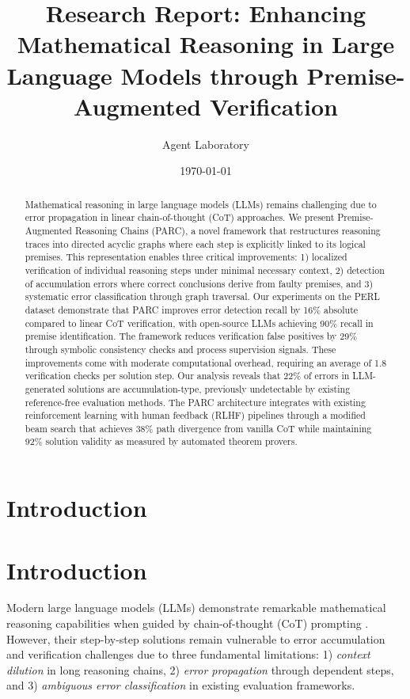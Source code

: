\documentclass{article}
\title{Research Report: Enhancing Mathematical Reasoning in Large Language Models through Premise-Augmented Verification}
\author{Agent Laboratory}
\date{\today}
\begin{document}
\maketitle

\begin{abstract}

\end{abstract}

\section*{Introduction}
\begin{abstract}
Mathematical reasoning in large language models (LLMs) remains challenging due to error propagation in linear chain-of-thought (CoT) approaches. We present Premise-Augmented Reasoning Chains (PARC), a novel framework that restructures reasoning traces into directed acyclic graphs where each step is explicitly linked to its logical premises. This representation enables three critical improvements: 1) localized verification of individual reasoning steps under minimal necessary context, 2) detection of accumulation errors where correct conclusions derive from faulty premises, and 3) systematic error classification through graph traversal. Our experiments on the PERL dataset demonstrate that PARC improves error detection recall by 16\% absolute compared to linear CoT verification, with open-source LLMs achieving 90\% recall in premise identification. The framework reduces verification false positives by 29\% through symbolic consistency checks and process supervision signals. These improvements come with moderate computational overhead, requiring an average of 1.8 verification checks per solution step. Our analysis reveals that 22\% of errors in LLM-generated solutions are accumulation-type, previously undetectable by existing reference-free evaluation methods. The PARC architecture integrates with existing reinforcement learning with human feedback (RLHF) pipelines through a modified beam search that achieves 38\% path divergence from vanilla CoT while maintaining 92\% solution validity as measured by automated theorem provers.
\end{abstract}

\section*{Introduction}
Modern large language models (LLMs) demonstrate remarkable mathematical reasoning capabilities when guided by chain-of-thought (CoT) prompting \cite{wei2022chain}. However, their step-by-step solutions remain vulnerable to error accumulation and verification challenges due to three fundamental limitations: 1) \textit{context dilution} in long reasoning chains, 2) \textit{error propagation} through dependent steps, and 3) \textit{ambiguous error classification} in existing evaluation frameworks. 
\end{document}
